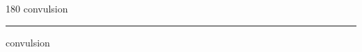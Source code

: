 
\begin{frame}
\begin{center}
\begin{turn}{180}
{\fontsize{2.5cm}{1em}\selectfont convulsion}
\end{turn}
\vspace{1em}\par  
\hrule
\vspace{1em}\par  
{\fontsize{2.5cm}{1em}\selectfont convulsion}
\end{center}
\end{frame}
